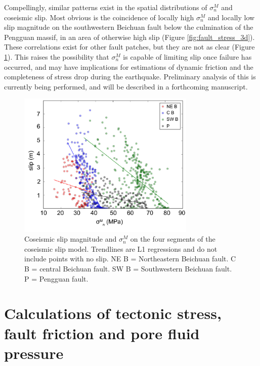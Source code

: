 \documentclass[twocolumn,jgrga]{AGUTeX}
\begin{document}
\begin{article}
Compellingly, similar patterns exist in the spatial distributions of
$\sigma^M_n$ and coseismic slip. Most obvious is the coincidence of
locally high $\sigma^M_n$ and locally low slip magnitude on the
southwestern Beichuan fault below the culmination of the Pengguan
massif, in an area of otherwise high slip (Figure
\ref{fig:fault_stress_3d}). These correlations exist for other fault
patches, but they are not as clear (Figure
\ref{fig:feng_slip_sig_n_scatter}). This raises the possibility that
$\sigma^M_n$ is capable of limiting slip once failure has occurred, and
may have implications for estimations of dynamic friction and the
completeness of stress drop during the earthquake. Preliminary analysis
of this is currently being performed, and will be described in a
forthcoming manuscript.

\begin{figure}%
\centering
\includegraphics[width=20pc]{../figures/feng_slip_sig_n_scatter.pdf}
\caption{Coseismic slip magnitude and $\sigma^M_n$ on the four segments
of the \citet{feng2010} coseismic slip model. Trendlines are
L1 regressions and do not include points with no slip. NE B =
Northeastern Beichuan fault. C B = central Beichuan fault. SW B =
Southwestern Beichuan fault. P = Pengguan fault.}
\label{fig:feng_slip_sig_n_scatter}
\end{figure}

\section{Calculations of tectonic stress, fault friction and pore fluid
pressure}\label{calculations-of-tectonic-stress-fault-friction-and-pore-fluid-pressure}


\end{article}
\end{document}
